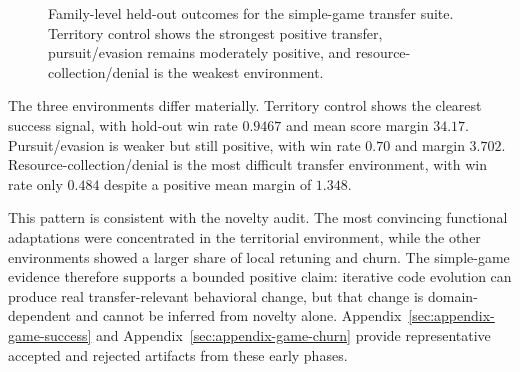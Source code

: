 \begin{figure}[t]
\centering
{}
\caption[Simple-game held-out outcomes]{Family-level held-out outcomes for the simple-game transfer suite. Territory control
shows the strongest positive transfer, pursuit/evasion remains moderately positive, and
resource-collection/denial is the weakest environment.}
\label{fig:games-transfer}
\end{figure}

The three environments differ materially. Territory control shows the clearest success signal, with
hold-out win rate $0.9467$ and mean score margin $34.17$. Pursuit/evasion is weaker but still
positive, with win rate $0.70$ and margin $3.702$. Resource-collection/denial is the most difficult
transfer environment, with win rate only $0.484$ despite a positive mean margin of $1.348$.

This pattern is consistent with the novelty audit. The most convincing functional adaptations were
concentrated in the territorial environment, while the other environments showed a larger share of
local retuning and churn. The simple-game evidence therefore supports a bounded positive claim:
iterative code evolution can produce real transfer-relevant behavioral change, but that change is
domain-dependent and cannot be inferred from novelty alone. Appendix~\ref{sec:appendix-game-success}
and Appendix~\ref{sec:appendix-game-churn} provide representative accepted and rejected artifacts
from these early phases.


